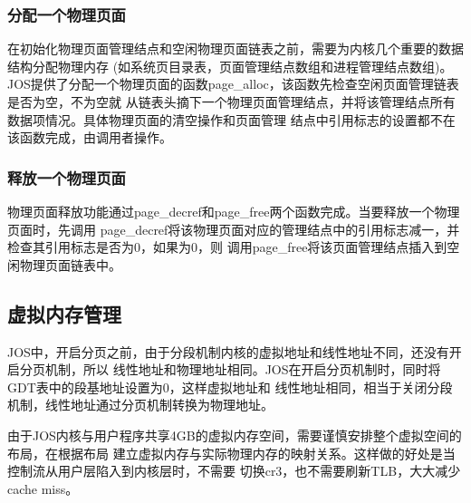 \documentclass[12pt,openany,a4paper]{report}
\begin{document}
	    	\subsubsection{分配一个物理页面}
	    在初始化物理页面管理结点和空闲物理页面链表之前，需要为内核几个重要的数据结构分配物理内存
	(如系统页目录表，页面管理结点数组和进程管理结点数组)。
	    JOS提供了分配一个物理页面的函数page\_alloc，该函数先检查空闲页面管理链表是否为空，不为空就
	从链表头摘下一个物理页面管理结点，并将该管理结点所有数据项情况。具体物理页面的清空操作和页面管理
	结点中引用标志的设置都不在该函数完成，由调用者操作。\par
	    	\subsubsection{释放一个物理页面}
	    物理页面释放功能通过page\_decref和page\_free两个函数完成。当要释放一个物理页面时，先调用
	page\_decref将该物理页面对应的管理结点中的引用标志减一，并检查其引用标志是否为0，如果为0，则
	调用page\_free将该页面管理结点插入到空闲物理页面链表中。\par	    

	\subsection{虚拟内存管理}

	    JOS中，开启分页之前，由于分段机制内核的虚拟地址和线性地址不同，还没有开启分页机制，所以
	线性地址和物理地址相同。JOS在开启分页机制时，同时将GDT表中的段基地址设置为0，这样虚拟地址和
	线性地址相同，相当于关闭分段机制，线性地址通过分页机制转换为物理地址。\par
	    由于JOS内核与用户程序共享4GB的虚拟内存空间，需要谨慎安排整个虚拟空间的布局，在根据布局
	建立虚拟内存与实际物理内存的映射关系。这样做的好处是当控制流从用户层陷入到内核层时，不需要
	切换cr3，也不需要刷新TLB，大大减少cache miss。\par
\end{document}
